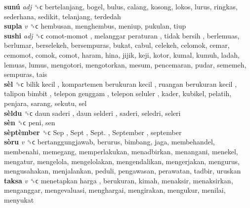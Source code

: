 \textbf{sunú} \emph{adj}  ␝ϲ  bertelanjang, bogel, bulus, calang, kosong, lokos, lurus, ringkas, sederhana, sedikit, telanjang, terdedah  \\
\textbf{supla} \emph{v}  ␝ϲ  hembusan, menghembus, meniup, pukulan, tiup  \\
\textbf{sushi} \emph{adj}  ␝ϲ   comot-momot ,  melanggar peraturan ,  tidak bersih , berlemuas, berlumar, berselekeh, bersempuras, bukat, cabul, celekeh, celomok, cemar, cemomot, comok, comot, haram, hina, jijik, keji, kotor, kumal, kumuh, ladah, lemuas, lumus, mengotori, mengotorkan, mesum, pencemaran, pudar, sememeh, sempuras, tais  \\
\textbf{sèl} ␝ϲ   bilik kecil ,  kompartemen berukuran kecil ,  ruangan berukuran kecil ,  talipon bimbit ,  telepon genggam ,  telepon seluler , kader, kubikel, pelatih, penjara, sarang, sekutu, sel  \\
\textbf{sèldu} ␝ϲ   daun saderi ,  daun selderi , saderi, seledri, seleri  \\
\textbf{sèn} ␝ϲ  peni, sen  \\
\textbf{sèptèmber} ␝ϲ   Sep ,  Sept ,  Sept. ,  September , september  \\
\textbf{sòru} \emph{v}  ␝ϲ  bertanggungjawab, berurus, bimbang, jaga, membehandel, membenahi, memegang, memperlakukan, menadbirkan, menangani, menekel, mengatur, mengelola, mengelolakan, mengendalikan, mengerjakan, mengurus, mengusahakan, menjalankan, peduli, pengawasan, perawatan, tadbir, uruskan  \\
\textbf{taksa} \emph{v}  ␝ϲ   menetapkan harga , berukuran, kimah, menaksir, menaksirkan, menganggar, mengevaluasi, menghargai, mengirakan, mengukur, menilai, menyukat  \\
